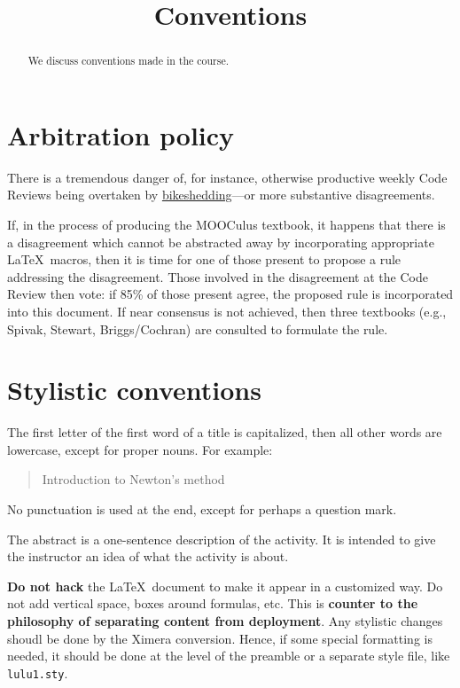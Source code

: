 \documentclass{ximera}
\title{Conventions}
\begin{document}
\begin{abstract}
  We discuss conventions made in the course.
\end{abstract}
\maketitle

\section{Arbitration policy}

There is a tremendous danger of, for instance, otherwise productive
weekly Code Reviews being overtaken by
\href{http://en.wikipedia.org/wiki/Parkinson's_law_of_triviality}{bikeshedding}---or more substantive disagreements.

If, in the process of producing the MOOCulus textbook, it happens that
there is a disagreement which cannot be abstracted away by
incorporating appropriate \LaTeX\ macros, then it is time for one of
those present to propose a rule addressing the disagreement.  Those
involved in the disagreement at the Code Review then vote: if 85\% of
those present agree, the proposed rule is incorporated into this
document.  If near consensus is not achieved, then three textbooks
(e.g., Spivak, Stewart, Briggs/Cochran) are consulted to formulate the
rule.


\section{Stylistic conventions}


The first letter of the first word of a title is capitalized, then all
other words are lowercase, except for proper nouns. For example:
\begin{quote}
Introduction to Newton's method
\end{quote}
No punctuation is used at the end, except for perhaps a question mark.

The abstract is a one-sentence description of the activity. It is
intended to give the instructor an idea of what the activity is about.


\textbf{Do not hack} the \LaTeX\ document to make it appear in a
customized way. Do not add vertical space, boxes around formulas,
etc. This is \textbf{counter to the philosophy of separating content
  from deployment}. Any stylistic changes shoudl be done by the Ximera
conversion. Hence, if some special formatting is needed, it should be
done at the level of the preamble or a separate style file, like
\texttt{lulu1.sty}.
\end{document}
